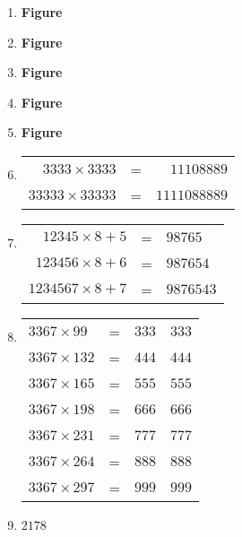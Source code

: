 \begin{enumerate}
\item
\begin{center}
{\bf Figure}
\end{center}

\item
\begin{center}
{\bf Figure}
\end{center}

\item
\begin{center}
{\bf Figure}
\end{center}

\item
\begin{center}
{\bf Figure}
\end{center}

\item
\begin{center}
{\bf Figure}
\end{center}

\item 
\begin{tabular}[t]{rrr}
$3333 \times 3333$ & = & $11108889$\\
$33333 \times 33333$ & = & $1111088889$
\end{tabular}

\smallskip
\item 
\begin{tabular}[t]{rrl}
$12345 \times 8 + 5$ & = & $98765$\\
$123456 \times 8 + 6$ & = & $987654$\\
$1234567 \times 8 + 7$ & = & $9876543$
\end{tabular}

\smallskip
\item
\begin{tabular}[t]{llll}
$3367 \times 99$ & = & $333$ & $333$\\
$3367 \times 132$ & = & $444$ & $444$\\
$3367 \times 165$ & = & $555$ & $555$\\
$3367 \times 198$ & = & $666$ & $666$\\
$3367 \times 231$ & = & $777$ & $777$\\
$3367 \times 264$ & = & $888$ & $888$\\
$3367 \times 297$ & = & $999$ & $999$
\end{tabular}

\item $2178$


\end{enumerate}
